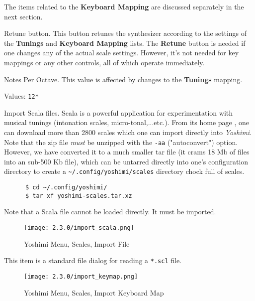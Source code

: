    The items related to the \textbf{Keyboard Mapping} are discussed
   separately in the next section.

   Retune button.
   This button retunes the synthesizer according to the settings of
   the \textbf{Tunings} and \textbf{Keyboard Mapping} lists.
   The \textbf{Retune} button is needed if one
   changes any of the actual scale settings. However, it's not needed for key
   mappings or any other controls, all of which operate immediately.

   Notes Per Octave.
   This value is affected by changes to the \textbf{Tunings} mapping.

   Values: \texttt{12*}

   Import Scala files.
   Scala is a powerful application for experimentation with musical tunings
   (intonation scales, micro-tonal,...etc.). From its home page \cite{scala},
   one can download more than 2800 scales which one can import directly into
   \textsl{Yoshimi}.  Note that the zip file \textsl{must} be unzipped with
   the \texttt{-aa} ("autoconvert") option.  However, we have converted it to a
   much smaller tar file (it crams 18 Mb of files into an sub-500 Kb file),
   which can be untarred directly into
   one's configuration directory to create a
   \texttt{\textasciitilde/.config/yoshimi/scales} directory chock full of
   scales.

    \begin{verbatim}
      $ cd ~/.config/yoshimi/
      $ tar xf yoshimi-scales.tar.xz
    \end{verbatim}

    Note that a Scala file cannot be loaded directly.  It must be imported.

\begin{figure}[H]
   \centering
   \texttt{[image: 2.3.0/import\_scala.png]}
   \caption{Yoshimi Menu, Scales, Import File}
   \label{fig:yoshimi_scales_import_file}
\end{figure}

   This item is a standard file dialog for reading
   a \texttt{*.scl} file.

\begin{figure}[H]
   \centering
   \texttt{[image: 2.3.0/import\_keymap.png]}
   \caption{Yoshimi Menu, Scales, Import Keyboard Map}
   \label{fig:yoshimi_scales_import_keyboard_map}
\end{figure}

